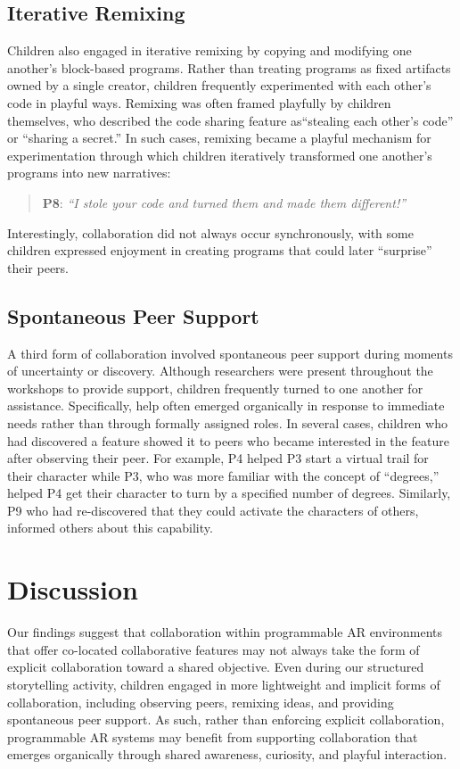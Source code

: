 \documentclass[sigconf,nonacm]{acmart}
\begin{document}
\subsection{Iterative Remixing}
Children also engaged in iterative remixing by copying and modifying one another’s block-based programs. Rather than treating programs as fixed artifacts owned by a single creator, children frequently experimented with each other’s code in playful ways. Remixing was often framed playfully by children themselves, who described the code sharing feature as``stealing each other’s code'' or ``sharing a secret.'' In such cases, remixing became a playful mechanism for experimentation through which children iteratively transformed one another’s programs into new narratives: 
\begin{quote}
    \textbf{P8}: \textit{``I stole your code and turned them and made them different!''}
\end{quote}

\noindent Interestingly, collaboration did not always occur synchronously, with some children expressed enjoyment in creating programs that could later ``surprise'' their peers.

\subsection{Spontaneous Peer Support}
A third form of collaboration involved spontaneous peer support during moments of uncertainty or discovery. Although researchers were present throughout the workshops to provide support, children frequently turned to one another for assistance. Specifically, help often emerged organically in response to immediate needs rather than through formally assigned roles. In several cases, children who had discovered a feature showed it to peers who became interested in the feature after observing their peer. For example, P4 helped P3 start a virtual trail for their character while P3, who was more familiar with the concept of ``degrees,'' helped P4 get their character to turn by a specified number of degrees. Similarly, P9 who had re-discovered that they could activate the characters of others, informed others about this capability.    

\section{Discussion}
Our findings suggest that collaboration within programmable AR environments that offer co-located collaborative features may not always take the form of explicit collaboration toward a shared objective. Even during our structured storytelling activity, children engaged in more lightweight and implicit forms of collaboration, including observing peers, remixing ideas, and providing spontaneous peer support. As such, rather than enforcing explicit collaboration, programmable AR systems may benefit from supporting collaboration that emerges organically through shared awareness, curiosity, and playful interaction.
\end{document}
